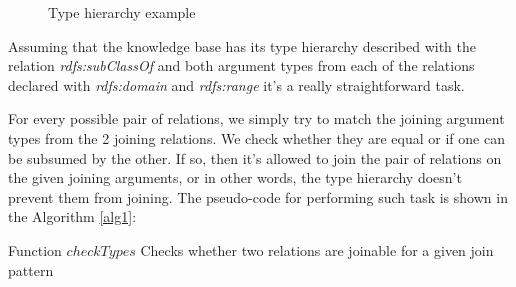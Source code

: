 \begin{figure}[!h]
  \caption{Type hierarchy example}
  \centering

\label{fig:typeHierarchy}
\end{figure}

Assuming that the knowledge base has its type hierarchy described with the relation \emph{rdfs:subClassOf} and both
argument types from each of the relations declared with \emph{rdfs:domain} and \emph{rdfs:range} it's a really
straightforward task.

For every possible pair of relations, we simply try to match the joining argument types from the 2 joining relations. We
check whether they are equal or if one can be subsumed by the other. If so, then it's allowed to join the pair of relations
on the given joining arguments, or in other words, the type hierarchy doesn't prevent them from joining. The pseudo-code
for performing such task is
shown in the Algorithm \ref{alg1}:

\begin{algorithm}[!h]
  \caption{Function $checkTypes$ \newline Checks whether two relations are joinable for a given join pattern}
 \label{alg1}
   {
  }
   {
  }
\end{algorithm}

